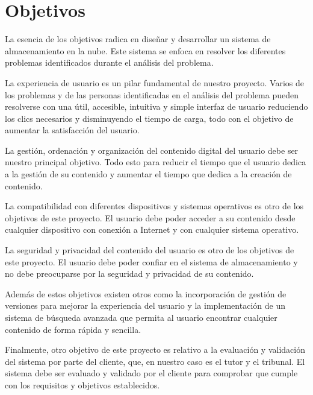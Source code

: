 \section{Objetivos}

La esencia de los objetivos radica en diseñar y desarrollar un sistema de almacenamiento en la nube. Este sistema se enfoca en resolver los diferentes problemas
identificados durante el análisis del problema. 

La experiencia de usuario es un pilar fundamental de nuestro proyecto. Varios de los problemas y de las personas identificadas en el análisis del problema
pueden resolverse con una útil, accesible, intuitiva y simple interfaz de usuario reduciendo los clics necesarios y disminuyendo el tiempo de carga,
todo con el objetivo de aumentar la satisfacción del usuario.

La gestión, ordenación y organización del contenido digital del usuario debe ser nuestro principal objetivo. Todo esto para reducir el tiempo que el usuario
dedica a la gestión de su contenido y aumentar el tiempo que dedica a la creación de contenido.

La compatibilidad con diferentes dispositivos y sistemas operativos es otro de los objetivos de este proyecto. El usuario debe poder acceder a su contenido
desde cualquier dispositivo con conexión a Internet y con cualquier sistema operativo.

La seguridad y privacidad del contenido del usuario es otro de los objetivos de este proyecto. El usuario debe poder confiar en el sistema de almacenamiento
y no debe preocuparse por la seguridad y privacidad de su contenido.

Además de estos objetivos existen otros como la incorporación de gestión de versiones para mejorar la experiencia del usuario y la implementación de un sistema
de búsqueda avanzada que permita al usuario encontrar cualquier contenido de forma rápida y sencilla.

Finalmente, otro objetivo de este proyecto es relativo a la evaluación y validación del sistema por parte del cliente, que, en nuestro caso es el tutor
y el tribunal. El sistema debe ser evaluado y validado por el cliente para comprobar que cumple con los requisitos y objetivos establecidos.
